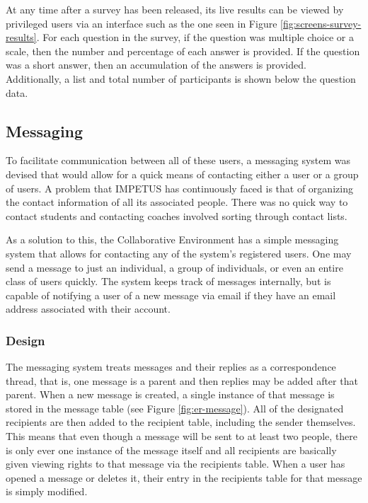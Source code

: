 At any time after a survey has been released, its live results can be viewed by privileged users via an interface such as the one seen in Figure \ref{fig:screens-survey-results}. For each question in the survey, if the question was multiple choice or a scale, then the number and percentage of each answer is provided. If the question was a short answer, then an accumulation of the answers is provided. Additionally, a list and total number of participants is shown below the question data.

\subsection{Messaging}
\label{subsec:design-messaging}
To facilitate communication between all of these users, a messaging system was devised that would allow for a quick means of contacting either a user or a group of users. A problem that IMPETUS has continuously faced is that of organizing the contact information of all its associated people. There was no quick way to contact students and contacting coaches involved sorting through contact lists.

As a solution to this, the Collaborative Environment has a simple messaging system that allows for contacting any of the system's registered users. One may send a message to just an individual, a group of individuals, or even an entire class of users quickly. The system keeps track of messages internally, but is capable of notifying a user of a new message via email if they have an email address associated with their account.

\subsubsection{Design}
The messaging system treats messages and their replies as a correspondence thread, that is, one message is a parent and then replies may be added after that parent. When a new message is created, a single instance of that message is stored in the message table (see Figure \ref{fig:er-message}). All of the designated recipients are then added to the recipient table, including the sender themselves. This means that even though a message will be sent to at least two people, there is only ever one instance of the message itself and all recipients are basically given viewing rights to that message via the recipients table. When a user has opened a message or deletes it, their entry in the recipients table for that message is simply modified.

